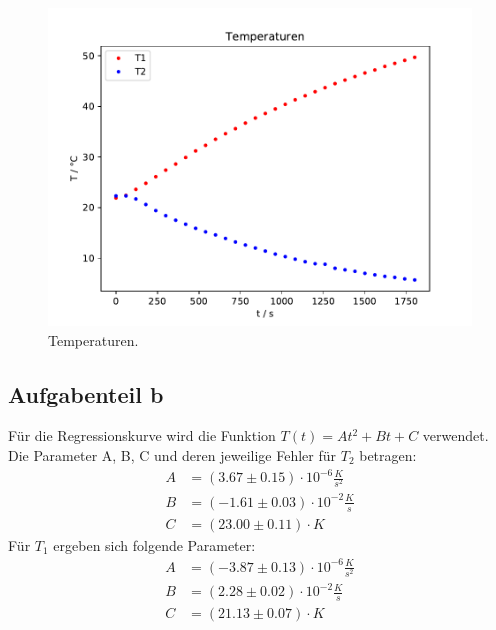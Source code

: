 \begin{figure}[H]
  \centering
  \includegraphics{build/Temperaturen.pdf}
  \caption{Temperaturen.}
  \label{fig:Temperaturen}
\end{figure}

\subsection{Aufgabenteil b}
Für die Regressionskurve wird die Funktion $T(t) = At^2 + Bt + C$ verwendet. Die
Parameter A, B, C und deren jeweilige Fehler für $T_2$ betragen:
\begin{align}
  A &= (3.67 \pm 0.15) \cdot 10^{-6} \frac{K}{s^2} \\
  B &= (-1.61 \pm 0.03) \cdot 10^{-2} \frac{K}{s}  \\
  C &= (23.00 \pm 0.11) \cdot K
\end{align}
Für $T_1$ ergeben sich folgende Parameter:
\begin{align}
  A &= (-3.87 \pm 0.13) \cdot 10^{-6} \frac{K}{s^2} \\
  B &= (2.28 \pm 0.02)  \cdot 10^{-2} \frac{K}{s}  \\
  C &= (21.13 \pm 0.07 )\cdot K
\end{align}
